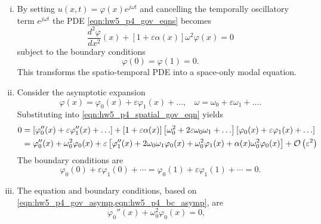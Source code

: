 \begin{enumerate}[(i)]
\item { %
    By setting $u(x, t) = \varphi(x) e^{j\omega t}$ and cancelling the temporally oscillatory term $e^{j\omega t}$ the PDE \cref{eqn:hw5_p4_gov_eqns} becomes 
    \begin{equation}\label{eqn:hw5_p4_spatial_gov_eqn}
        \frac{d^2 \varphi}{dx^2}(x) + \left[1 + \varepsilon \alpha(x)\right] \omega^2 \varphi(x) = 0
    \end{equation}
    subject to the boundary conditions 
    \begin{equation}
        \varphi(0) = \varphi(1) = 0.
    \end{equation}
    This transforms the spatio-temporal PDE into a space-only modal equation. 
}
\item { %
    Consider the asymptotic expansion 
    \begin{equation}
        \varphi(x) = \varphi_0(x) + \varepsilon \varphi_1(x) + \ldots, ~~~~ 
        \omega = \omega_0 + \varepsilon \omega_1 + \ldots.
    \end{equation}
    Substituting into \cref{eqn:hw5_p4_spatial_gov_eqn} yields 
    \begin{equation}\label{eqn:hw5_p4_gov_asymp}
    \begin{aligned}
        0 &= \left[\varphi_0''(x) + \varepsilon \varphi_1''(x) + \ldots \right] + \left[1 + \varepsilon \alpha(x)\right] \left[\omega_0^2 + 2 \varepsilon \omega_0\omega_1 + \ldots \right] \left[\varphi_0(x) + \varepsilon \varphi_1(x) + \ldots \right]  \\
        &= \varphi_0''(x) + \omega_0^2 \varphi_0(x) + \varepsilon \left[\varphi_1''(x) + 2\omega_0\omega_1 \varphi_0(x) + \omega_0^2 \varphi_1(x) + \alpha(x) \omega_0^2 \varphi_0(x)\right] + \mathcal{O} \left( \varepsilon^2 \right) \\
    \end{aligned}
    \end{equation}
    The boundary conditions are 
    \begin{equation}\label{eqn:hw5_p4_bc_asymp}
        \varphi_0(0) + \varepsilon \varphi_1(0) + \cdots = \varphi_0(1) + \varepsilon \varphi_1(1) + \cdots = 0.
    \end{equation}
}
\item { %
    The  equation and boundary conditions, based on \cref{eqn:hw5_p4_gov_asymp,eqn:hw5_p4_bc_asymp}, are 
    \begin{equation}\label{eqn:hw5_p4_gov_0}
        \varphi_0''(x) + \omega_0^2 \varphi_0(x) = 0, ~~~~ 

\end{equation}}
\end{enumerate}
